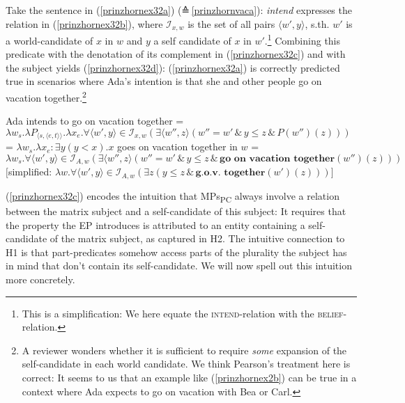 \documentclass[output=paper]{langscibook}
\begin{document}
Take the sentence in (\ref{prinzhornex32a}) (≙\,\ref{prinzhornvaca}): \textit{intend} expresses the relation in (\ref{prinzhornex32b}), where  $\mathcal{I}_{x,w}$ is the set of all pairs $\langle w',y \rangle$, s.th. $w'$ is a world-candidate of $x$ in $w$ and $y$ a self candidate of $x$ in $w'$.\footnote{This is a simplification: We here equate the \textsc{intend}-relation with the \textsc{belief}-relation.} Combining this predicate with the denotation of its complement in (\ref{prinzhornex32c}) and with the subject yields (\ref{prinzhornex32d}): (\ref{prinzhornex32a}) is correctly predicted true in scenarios where Ada's intention is that she and other people  go on vacation together.\footnote{A reviewer wonders whether it is sufficient to require \textit{some} expansion of the self-candidate in each world candidate. We think Pearson's treatment here is correct: It seems to us that an example like (\ref{prinzhornex2b}) can be true in a context where Ada expects to go on vacation with Bea or Carl.}


\ea 	\label{prinzhornhazels}
\ea Ada intends to go on vacation together \label{prinzhornex32a}
\ex   {} = $\lambda w_{s}. \lambda P_{\langle s,\langle e,t \rangle \rangle}. \lambda x_{e}. \forall \langle w' ,y \rangle \in \mathcal{I}_{x,w} (\exists \langle w'', z \rangle (w'' = w' \, \& \, y \le z\, \& \,P(w'')(z)))$ \label{prinzhornex32b}
\ex {} = $\lambda w_{s}. \lambda x_{e}: \exists y (y < x). x$ goes on vacation together in $w$\label{prinzhornex32c}
\ex   \sem{}{(\ref{prinzhornex32a})} = $\lambda w_{s}. \forall \langle w' ,y \rangle \in \mathcal{I}_{A,w} (\exists \langle w'', z \rangle (w'' = w' \, \& \, y \le z\, \& \,\textbf{go on vacation together} (w'')(z)))$ \\
$[$simplified: $\lambda w. \forall \langle w' ,y \rangle \in \mathcal{I}_{A,w} (\exists z (y \le z\, \& \,\textbf{g.o.v. together} (w')(z)))]$ \label{prinzhornex32d}
\z\z

(\ref{prinzhornex32c}) encodes the intuition that MPs\textsubscript{PC} always involve a relation between the matrix subject and a self-candidate of this subject: It requires that  the property  the EP introduces is attributed to an entity containing a self-candidate of the matrix subject, as captured in H2. The intuitive connection to H1 is that part-predicates somehow access parts of the plurality the subject has in mind that don't contain its self-candidate. We will now spell out this intuition more concretely.
\end{document}

